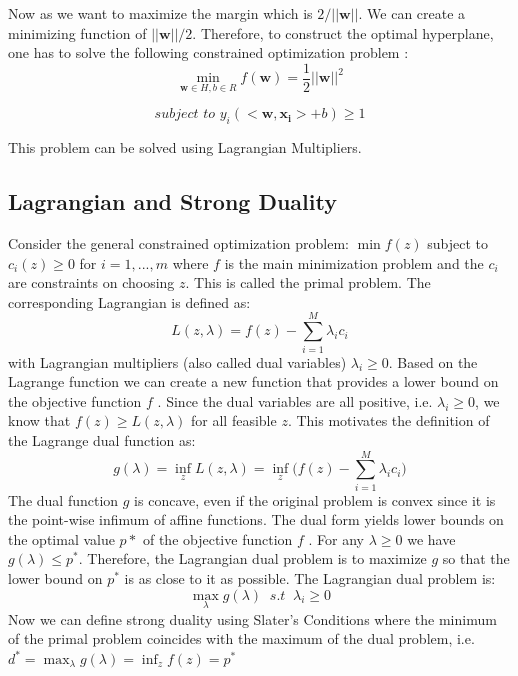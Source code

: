 \documentclass{article}
\begin{document}
Now as we want to maximize the margin which is $2/||\bm{w}||$. We can create a minimizing function of $||\bm{w}||/2$. Therefore, to construct the optimal hyperplane, one has to solve the following constrained optimization problem \cite{kevin,bishop}:
\begin{equation}
\label{eq:primal}
    \min_{\bm{w} \in H, b \in R} f(\bm{w}) = \frac{1}{2}||\bm{w}||^2
\end{equation}
\begin{center}
\begin{equation*}
\textit{subject to } y_i(<\bm{w},\bm{x_i}> + b) \geq1
\end{equation*}
\end{center}
This problem can be solved using Lagrangian Multipliers.

\subsection{Lagrangian and Strong Duality}
Consider the general constrained optimization problem: $\min f(z)$ subject to $c_i(z) \geq 0$ for $ i = 1,...,m$ where $f$ is the main minimization problem and the $c_i$ are constraints on choosing $z$. This is called the primal problem. The corresponding Lagrangian is defined as:
\begin{equation}
\label{eq:lag}
    L(z,\lambda) = f(z) - \sum_{i=1}^M{\lambda_i c_i}
\end{equation}
with Lagrangian multipliers (also called dual variables) $\lambda_i \geq 0$. Based on the Lagrange function we can create a new function that provides a lower bound on the objective function $f$ . Since the dual variables are all positive, i.e. $\lambda_i \geq 0$, we know that $f(z) \geq L(z, \lambda)$ for all feasible $z$. This motivates the definition of the Lagrange dual function as:
\begin{equation}
    g(\lambda) = \inf_{z} L(z,\lambda) = \inf_z \Big( f(z) - \sum_{i=1}^M{\lambda_i c_i} \Big)
\end{equation}
The dual function $g$ is concave, even if the original problem is convex since it is the point-wise infimum of affine functions. The dual form yields lower bounds on the optimal value $p*$ of the objective function $f$ . For any $\lambda \geq 0$ we have $g(\lambda) \leq p^*$. Therefore, the Lagrangian dual problem is to maximize $g$ so that the lower bound on $p^*$ is as close to it as possible. The Lagrangian dual problem is:
\begin{equation}
    \max_\lambda g(\lambda) \ \textit{ s.t } \ \lambda_i \geq 0
\end{equation}
Now we can define strong duality using Slater’s Conditions where the minimum of the primal problem coincides with the maximum of the dual problem, i.e. $d^* = \max_\lambda g(\lambda) =\inf_z f(z) = p^*$
\end{document}
